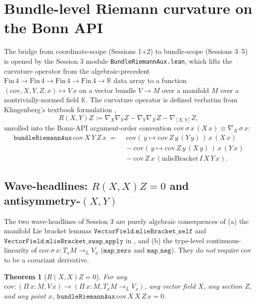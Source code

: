 \documentclass[twocolumn]{revtex4-2}
\newtheorem{theorem}{Theorem}
\begin{document}
\section{Bundle-level Riemann curvature on the Bonn API}\label{sec:bundle-aux}

The bridge from coordinate-scope (Sessions 1+2) to bundle-scope
(Sessions 3--5) is opened by the Session 3 module
\texttt{BundleRiemannAux.lean}, which lifts the curvature operator
from the algebraic-precedent $\mathrm{Fin}\,4 \to \mathrm{Fin}\,4 \to
\mathrm{Fin}\,4 \to \mathrm{Fin}\,4 \to \mathbb{R}$ data array to a
function $(\mathrm{cov}, X, Y, Z, x) \mapsto V\,x$ on a vector bundle
$V \to M$ over a manifold $M$ over a nontrivially-normed field
$\mathbb{K}$. The curvature operator is defined verbatim from
Klingenberg's textbook formulation \cite{Klingenberg1995},
\begin{equation}
R(X, Y) Z := \nabla_{X} \nabla_{Y} Z - \nabla_{Y} \nabla_{X} Z
            - \nabla_{[X, Y]} Z,
\label{eq:bundle-riem}
\end{equation}
unrolled into the Bonn-API argument-order convention
$\mathrm{cov}\,\sigma\,x\,(X\,x) \equiv \nabla_{X}\,\sigma\,x$:
\begin{align}
\mathtt{bundleRiemannAux}\,\mathrm{cov}\,X\,Y\,Z\,x
\;=\;
&\,\mathrm{cov}(\,y \mapsto \mathrm{cov}\,Z\,y\,(Y\,y)\,)\,x\,(X\,x)
\nonumber \\
& \!\! - \mathrm{cov}(\,y \mapsto \mathrm{cov}\,Z\,y\,(X\,y)\,)\,x\,(Y\,x)
\nonumber \\
& \!\! - \mathrm{cov}\,Z\,x\,(\mathrm{mlieBracket}\,I\,X\,Y\,x).
\label{eq:bundle-riem-aux}
\end{align}

\subsection{Wave-headlines: $R(X, X)Z = 0$ and antisymmetry-$(X, Y)$}
\label{sec:bundle-aux-headlines}
The two wave-headlines of Session 3 are purely algebraic consequences
of (a) the manifold Lie bracket lemmas
$\texttt{VectorField.mlieBracket\_self}$ and
$\texttt{VectorField.mlieBracket\_swap\_apply}$ in
\cite{Gouezel2024LieBracket}, and (b) the type-level
continuous-linearity of $\mathrm{cov}\,\sigma\,x : T_xM \to_L V_x$
($\mathtt{map\_zero}$ and $\mathtt{map\_neg}$). They do \emph{not}
require $\mathrm{cov}$ to be a covariant derivative.

\begin{theorem}[$R(X, X)Z = 0$]\label{thm:bundleRiem-self}
For any $\mathrm{cov} : (\Pi\,x : M, V\,x) \to (\Pi\,x : M, T_xM \to_L V_x)$,
any vector field $X$, any section $Z$, and any point $x$,
$\mathtt{bundleRiemannAux}\,\mathrm{cov}\,X\,X\,Z\,x = 0$.
\end{theorem}
\end{document}
